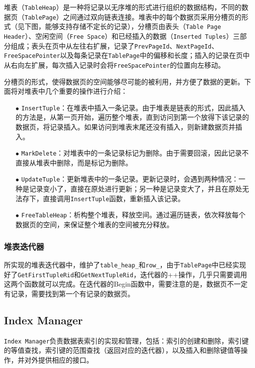 \documentclass[12pt]{article}
\begin{document}
    堆表（\texttt{TableHeap}）是一种将记录以无序堆的形式进行组织的数据结构，不同的数据页（\texttt{TablePage}）之间通过双向链表连接。堆表中的每个数据页采用分槽页的形式（见下图，能够支持存储不定长的记录），分槽页由表头（\texttt{Table Page Header}）、空闲空间（\texttt{Free Space}）和已经插入的数据（\texttt{Inserted Tuples}）三部分组成；表头在页中从左往右扩展，记录了\texttt{PrevPageId}、\texttt{NextPageId}、\texttt{FreeSpacePointer}以及每条记录在\texttt{TablePage}中的偏移和长度；插入的记录在页中从右向左扩展，每次插入记录时会将\texttt{FreeSpacePointer}的位置向左移动。

    分槽页的形式，使得数据页的空间能够尽可能的被利用，并方便了数据的更新。下面将对堆表中几个重要的操作进行介绍：
    \begin{itemize}
        \item[$\bullet$] \texttt{InsertTuple}：在堆表中插入一条记录。由于堆表是链表的形式，因此插入的方法是，从第一页开始，遍历整个堆表，直到访问到第一个放得下该记录的数据页，将记录插入。如果访问到堆表末尾还没有插入，则新建数据页并插入。
        \item[$\bullet$] \texttt{MarkDelete}：对堆表中的一条记录标记为删除。由于需要回滚，因此记录不直接从堆表中删除，而是标记为删除。
        \item[$\bullet$] \texttt{UpdateTuple}：更新堆表中的一条记录。更新记录时，会遇到两种情况：一种是记录变小了，直接在原处进行更新；另一种是记录变大了，并且在原处无法存下，直接调用\texttt{InsertTuple}函数，重新插入该记录。
        \item[$\bullet$] \texttt{FreeTableHeap}：析构整个堆表，释放空间。通过遍历链表，依次释放每个数据页的空间，来保证整个堆表的空间被充分释放。
    \end{itemize}

    \subsubsection{堆表迭代器}
    所实现的堆表迭代器中，维护了\texttt{table\_heap\_}和\texttt{row\_}，由于\texttt{TablePage}中已经实现好了\texttt{GetFirstTupleRid}和\texttt{GetNextTupleRid}，迭代器的++操作，几乎只需要调用这两个函数就可以完成。在迭代器的Begin函数中，需要注意的是，数据页不一定有记录，需要找到第一个有记录的数据页。
    \subsection{Index Manager}
    \texttt{Index Manager}负责数据表索引的实现和管理，包括：索引的创建和删除，索引键的等值查找，索引键的范围查找（返回对应的迭代器），以及插入和删除键值等操作，并对外提供相应的接口。
    
\end{document}
